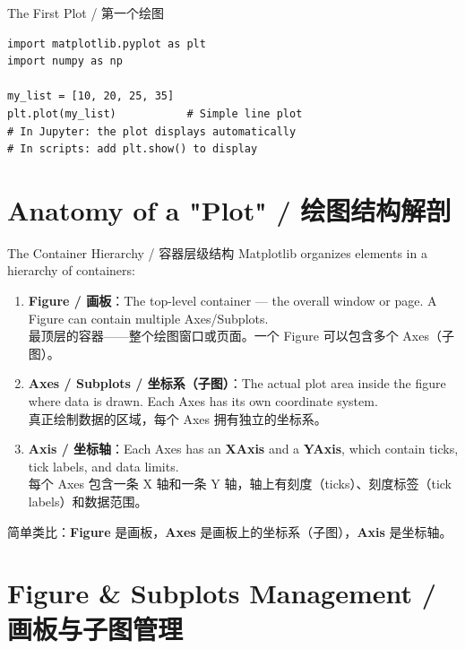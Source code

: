 \documentclass[11pt,a4paper]{report}
\begin{document}
\begin{examplebox}{The First Plot / 第一个绘图}
\begin{lstlisting}
import matplotlib.pyplot as plt
import numpy as np

my_list = [10, 20, 25, 35]
plt.plot(my_list)           # Simple line plot
# In Jupyter: the plot displays automatically
# In scripts: add plt.show() to display
\end{lstlisting}
\end{examplebox}

\section{Anatomy of a "Plot" / 绘图结构解剖}

\begin{concept}{The Container Hierarchy / 容器层级结构}
    Matplotlib organizes elements in a hierarchy of containers:
    \begin{enumerate}[itemsep=0.5em]
        \item \textbf{Figure / 画板}：The top-level container — the overall window or page. A Figure can contain multiple Axes/Subplots. \\
        最顶层的容器——整个绘图窗口或页面。一个 Figure 可以包含多个 Axes（子图）。
        \item \textbf{Axes / Subplots / 坐标系（子图）}：The actual plot area inside the figure where data is drawn. Each Axes has its own coordinate system. \\
        真正绘制数据的区域，每个 Axes 拥有独立的坐标系。
        \item \textbf{Axis / 坐标轴}：Each Axes has an \textbf{XAxis} and a \textbf{YAxis}, which contain ticks, tick labels, and data limits. \\
        每个 Axes 包含一条 X 轴和一条 Y 轴，轴上有刻度（ticks）、刻度标签（tick labels）和数据范围。
    \end{enumerate}
    简单类比：\textbf{Figure} 是画板，\textbf{Axes} 是画板上的坐标系（子图），\textbf{Axis} 是坐标轴。
\end{concept}

\section{Figure \& Subplots Management / 画板与子图管理}
\end{document}
